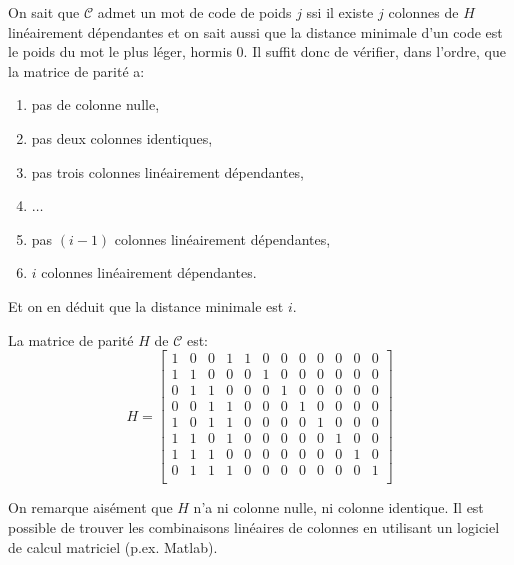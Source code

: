 \documentclass[a4paper,10pt,twocolumn]{article}
\theoremstyle{break}
\newcommand{\code}[1]{\mathcal{#1}}
\newcommand{\C}{\code{C}}
\begin{document}
On sait que $\C$ admet un mot de code de poids $j$ ssi il existe $j$ colonnes de $H$ linéairement dépendantes et on sait aussi que la distance minimale d'un code est le poids du mot le plus léger, hormis 0. Il suffit donc de vérifier, dans l'ordre, que la matrice de parité a:
\begin{enumerate}
 \item pas de colonne nulle,
 \item pas deux colonnes identiques,
 \item pas trois colonnes linéairement dépendantes,
 \item $\ldots$
 \item pas $(i - 1)$ colonnes linéairement dépendantes,
 \item $i$ colonnes linéairement dépendantes.
\end{enumerate}

Et on en déduit que la distance minimale est $i$.

La matrice de parité $H$ de $\C$ est:
$$ H = \left[
\begin{array}{cccccccccccc}
 1 & 0 & 0 & 1 & 1 & 0 & 0 & 0 & 0 & 0 & 0 & 0 \\
 1 & 1 & 0 & 0 & 0 & 1 & 0 & 0 & 0 & 0 & 0 & 0 \\
 0 & 1 & 1 & 0 & 0 & 0 & 1 & 0 & 0 & 0 & 0 & 0 \\
 0 & 0 & 1 & 1 & 0 & 0 & 0 & 1 & 0 & 0 & 0 & 0 \\
 1 & 0 & 1 & 1 & 0 & 0 & 0 & 0 & 1 & 0 & 0 & 0 \\
 1 & 1 & 0 & 1 & 0 & 0 & 0 & 0 & 0 & 1 & 0 & 0 \\
 1 & 1 & 1 & 0 & 0 & 0 & 0 & 0 & 0 & 0 & 1 & 0 \\
 0 & 1 & 1 & 1 & 0 & 0 & 0 & 0 & 0 & 0 & 0 & 1 \\
\end{array}
\right]$$

On remarque aisément que $H$ n'a ni colonne nulle, ni colonne identique. 
Il est possible de trouver les combinaisons linéaires de colonnes
en utilisant un logiciel de calcul matriciel (p.ex. Matlab).
\end{document}
